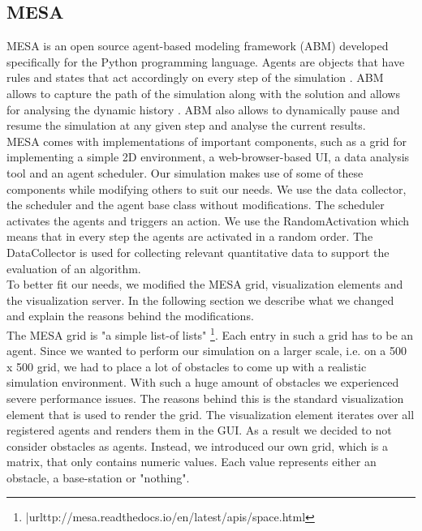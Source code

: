 \subsection{MESA}
MESA \cite{masad.2015} is an open source agent-based modeling framework (ABM) developed specifically for the Python programming language.  Agents are objects that have rules and states that act accordingly on every step of the simulation \cite{axtell.2000}. ABM allows to capture the path of the simulation along with the solution and allows for analysing the dynamic history \cite{axtell.2000}. ABM also allows to dynamically pause and resume the simulation at any given step and analyse the current results.\\
MESA comes with implementations of important components, such as a grid for implementing a simple 2D environment, a web-browser-based UI, a data analysis tool and an agent scheduler. Our simulation makes use of some of these components while modifying others to suit our needs. We use the data collector, the scheduler and the agent base class without modifications. The scheduler activates the agents and triggers an action. We use the RandomActivation which means that in every step the agents are activated in a random order. The DataCollector is used for collecting relevant quantitative data to support the evaluation of an algorithm.\\
To better fit our needs, we modified the MESA grid, visualization elements and the visualization server. In the following section we describe what we changed and explain the reasons behind the modifications.\\
The MESA grid is "a simple list-of lists" \footnote{|url{ttp://mesa.readthedocs.io/en/latest/apis/space.html}}. Each entry in such a grid has to be an agent. Since we wanted to perform our simulation on a larger scale, i.e. on a 500 x 500 grid, we had to place a lot of obstacles to come up with a realistic simulation environment. With such a huge amount of obstacles we experienced severe performance issues. The reasons behind this is the standard visualization element that is used to render the grid. The visualization element iterates over all registered agents and renders them in the GUI. As a result we decided to not consider obstacles as agents. Instead, we introduced our own grid, which is a matrix, that only contains numeric values. Each value represents either an obstacle, a base-station or "nothing". 
 
